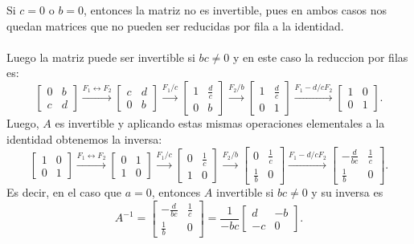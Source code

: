 \documentclass{article}
\theoremstyle{definition}
\theoremstyle{definition}
\theoremstyle{remark}
\begin{document}
   Si $c =0$ o $b=0$, entonces la matriz no es invertible, pues en ambos casos nos quedan matrices que no pueden ser reducidas por fila a la identidad. \\\\ Luego la matriz puede ser invertible si $bc \neq 0$ y en este caso la reduccion por filas es: \[
     \begin{bmatrix} 0 & b \\ c & d \end{bmatrix} \xrightarrow{F_1 \leftrightarrow F_2} \begin{bmatrix}c & d \\ 0 & b \end{bmatrix} \xrightarrow{F_1 / c } \begin{bmatrix} 1 & \frac{d}{c} \\ 0 & b \end{bmatrix} \xrightarrow{F_2 / b} \begin{bmatrix} 1 & \frac{d}{c} \\ 0 & 1 \end{bmatrix} \xrightarrow{F_1-d/cF_2} \begin{bmatrix}1 & 0 \\ 0 & 1 \end{bmatrix}.
   \]
   Luego, $A$ es invertible y aplicando estas mismas operaciones elementales a la identidad obtenemos la inversa: \[
     \begin{bmatrix} 1 & 0 \\ 0 & 1 \end{bmatrix} \xrightarrow{F_1 \leftrightarrow F_2} \begin{bmatrix} 0 & 1 \\ 1 & 0 \end{bmatrix} \xrightarrow{F_1/c} \begin{bmatrix}0 & \frac{1}{c} \\ 1 & 0 \end{bmatrix} \xrightarrow{F_2 / b} \begin{bmatrix} 0 & \frac{1}{c} \\ \frac{1}{b} & 0 \end{bmatrix} \xrightarrow{F_1-d / cF_2 } \begin{bmatrix}-\frac{d}{bc} & \frac{1}{c} \\ \frac{1}{b} & 0 \end{bmatrix}.
   \]
   Es decir, en el caso que $a=0$, entonces $A$ invertible si $bc \neq 0$ y su inversa es \begin{equation}
     A^{-1}=\begin{bmatrix}-\frac{d}{bc} & \frac{1}{c} \\[2ex] \frac{1}{b} & 0 \end{bmatrix} = \frac{1}{-bc} \begin{bmatrix}d & -b \\ -c & 0 \end{bmatrix}. 
   \end{equation}
\end{document}
